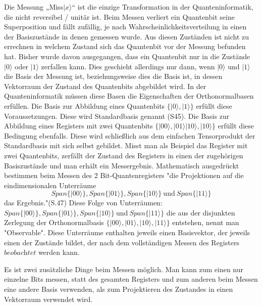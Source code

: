 Die Messung „Miss$\left|x\right.\rangle$“ ist die einzige Transformation in der Quanteninformatik, die nicht reversibel / unitär ist. Beim Messen verliert ein Quantenbit seine Superposition und fällt zufällig, je nach Wahrscheinlichkeitsverteilung in einen der Basiszustände in denen gemessen wurde. Aus diesen Zuständen ist nicht zu errechnen in welchem Zustand sich das Quantenbit vor der Messung befunden hat. Bisher wurde davon ausgegangen, dass ein Quantenbit nur in die Zustände $\left|0\right.\rangle$ oder $\left|1\right.\rangle$ zerfallen kann. Dies geschieht allerdings nur dann, wenn $\left|0\right.\rangle$ und $\left|1\right.\rangle$ die Basis der Messung ist, beziehungsweise dies die Basis ist, in dessen Vektorraum der Zustand des Quantenbits abgebildet wird. 
In der Quanteninformatik müssen diese Basen die Eigenschaften der Orthonormalbasen erfüllen. Die Basis zur Abbildung eines Quantenbits $\{\left|0\right.\rangle,\left|1\right.\rangle\}$ erfüllt diese Voraussetzungen. Diese wird Standardbasis genannt (S45). Die Basis zur Abbildung eines Registers mit zwei Quantenbits $\{\left|00\right.\rangle,\left|01\right.\rangle\left|10\right.\rangle,\left|10\right.\rangle\}$ erfüllt diese Bedingung ebenfalls. Diese wird schließlich aus dem einfachen Tensorprodukt der Standardbasis mit sich selbst gebildet. 
Misst man als Beispiel das Register mit zwei Quantenbits, zerfällt der Zustand des Registers in einen der zugehörigen Basiszustände und man erhält ein Messergebnis.
Mathematisch ausgedrückt bestimmen beim Messen des 2 Bit-Quantenregisters "die Projektionen auf die eindimensionalen Unterräume 
$$Span\{\left|00\right.\rangle\},Span\{\left|01\right.\rangle\},Span\{\left|10\right.\rangle\}\ \text{und}\ Span\{\left|11\right.\rangle\}$$
das Ergebnis."(S.47)
Diese Folge von Unterräumen: $Span\{\left|00\right.\rangle\},Span\{\left|01\right.\rangle\},Span\{\left|10\right.\rangle\}\ \text{und}\ Span\{\left|11\right.\rangle\}$ die aus der disjunkten Zerlegung der Orthonormalbasis $\{\left|00\right.\rangle,\left|01\right.\rangle,\left|10\right.\rangle,\left|11\right.\rangle\}$ entstehen, nennt man "Observable".
Diese Unterräume enthalten jeweils einen Basisvektor, der jeweils einen der Zustände bildet, der nach dem vollständigen Messen des Registers $\textit{beobachtet}$ werden kann.

Es ist zwei zusätzliche Dinge beim Messen möglich. Man kann zum einen nur einzelne Bits messen, statt des gesamten Registers und zum anderen beim Messen eine andere Basis verwenden, als zum Projektieren des Zustandes in einen Vektorraum verwendet wird. 

